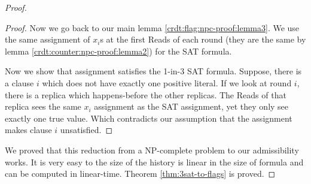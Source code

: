 \begin{proof}
\begin{proof}
  Now we go back to our main lemma \ref{crdt:flag:npc-proof:lemma3}. We use the same assignment of $x_i$s at the first \textrm{Read}s of each round (they are the same by lemma \ref{crdt:counter:npc-proof:lemma2}) for the SAT formula.

  Now we show that assignment satisfies the 1-in-3 SAT formula. Suppose, there is a clause $i$ which does not have exactly one positive literal. If we look at round $i$, there is a replica which happens-before the other replicas. The \textrm{Read}s of that replica sees the same $x_i$ assignment as the SAT assignment, yet they only see exactly one true value. Which contradicts our assumption that the assignment makes clause $i$ unsatisfied.
\end{proof}

We proved that this reduction from a NP-complete problem to our admissibility works. It is very easy to the size of the history is linear in the size of formula and can be computed in linear-time. Theorem \ref{thm:3sat-to-flags} is proved.



\end{proof}
